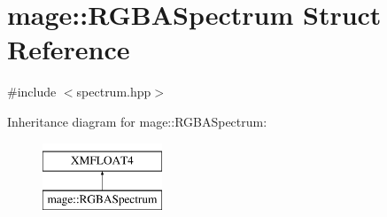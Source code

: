 \hypertarget{structmage_1_1_r_g_b_a_spectrum}{}\section{mage\+:\+:R\+G\+B\+A\+Spectrum Struct Reference}
\label{structmage_1_1_r_g_b_a_spectrum}


{\ttfamily \#include $<$spectrum.\+hpp$>$}

Inheritance diagram for mage\+:\+:R\+G\+B\+A\+Spectrum\+:\begin{figure}[H]
\begin{center}
\leavevmode
\includegraphics[height=2.000000cm]{structmage_1_1_r_g_b_a_spectrum}
\end{center}
\end{figure}
